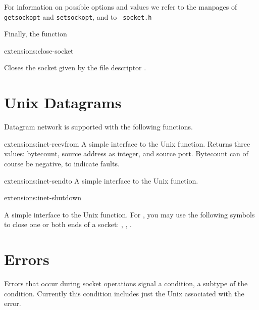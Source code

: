 For information on possible options and values we refer to the
manpages of {\tt getsockopt} and {\tt setsockopt}, and to {\tt
 socket.h}

Finally, the function

\begin{defun}{extensions:}{close-socket}{%
    }

  Closes the socket given by the file descriptor .

\end{defun}

\section{Unix Datagrams}

Datagram network is supported with the following functions.

\begin{defun}{extensions:}{inet-recvfrom}{%
	}
   A simple interface to the Unix  function. Returns
   three values: bytecount, source address as integer, and source
   port. Bytecount can of course be negative, to indicate faults.
\end{defun}

\begin{defun}{extensions:}{inet-sendto}{%
	}
   A simple interface to the Unix  function.
\end{defun}

\begin{defun}{extensions:}{inet-shutdown}{%
	}

   A simple interface to the Unix  function.  For
   , you may use the following symbols to close one or
   both ends of a socket: , ,
   .

\end{defun}

\section{Errors}

Errors that occur during socket operations signal a
 condition, a subtype of the 
condition.  Currently this condition includes just the Unix
 associated with the error.
